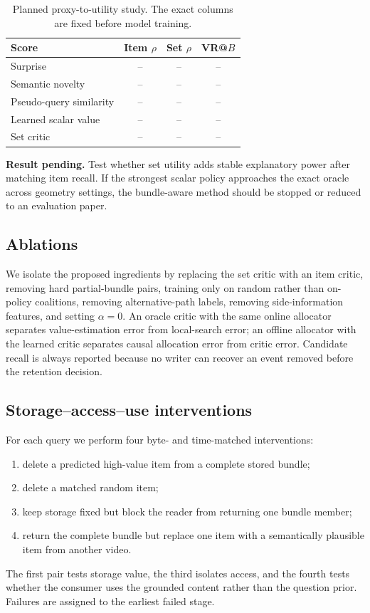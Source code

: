 \documentclass[10pt,twocolumn,letterpaper]{article}
\newcommand{\resultpending}[1]{%
  \begingroup\setlength{\fboxsep}{3pt}%
  \colorbox{placeholdergray}{\parbox{0.94\linewidth}{\textcolor{draftorange}{\textbf{Result pending.} #1}}}%
  \endgroup}
\begin{document}
\begin{table}[t]
\centering
\caption{Planned proxy-to-utility study. The exact columns are fixed before model training.}
\label{tab:proxy}
\scriptsize
\setlength{\tabcolsep}{3.5pt}
\begin{tabularx}{\columnwidth}{>{\raggedright\arraybackslash}Xccc}
\toprule
Score & Item $\rho$ & Set $\rho$ & VR@$B$ \\
\midrule
Surprise & -- & -- & -- \\
Semantic novelty & -- & -- & -- \\
Pseudo-query similarity & -- & -- & -- \\
Learned scalar value & -- & -- & -- \\
Set critic & -- & -- & -- \\
\bottomrule
\end{tabularx}
\end{table}

\resultpending{Test whether set utility adds stable explanatory power after matching item recall. If the strongest scalar policy approaches the exact oracle across geometry settings, the bundle-aware method should be stopped or reduced to an evaluation paper.}

\subsection{Ablations}

We isolate the proposed ingredients by replacing the set critic with an item critic, removing hard partial-bundle pairs, training only on random rather than on-policy coalitions, removing alternative-path labels, removing side-information features, and setting $\alpha=0$.
An oracle critic with the same online allocator separates value-estimation error from local-search error; an offline allocator with the learned critic separates causal allocation error from critic error.
Candidate recall is always reported because no writer can recover an event removed before the retention decision.

\subsection{Storage--access--use interventions}

For each query we perform four byte- and time-matched interventions:
\begin{enumerate}[leftmargin=*,itemsep=1pt]
    \item delete a predicted high-value item from a complete stored bundle;
    \item delete a matched random item;
    \item keep storage fixed but block the reader from returning one bundle member;
    \item return the complete bundle but replace one item with a semantically plausible item from another video.
\end{enumerate}
The first pair tests storage value, the third isolates access, and the fourth tests whether the consumer uses the grounded content rather than the question prior.
Failures are assigned to the earliest failed stage.
\end{document}

